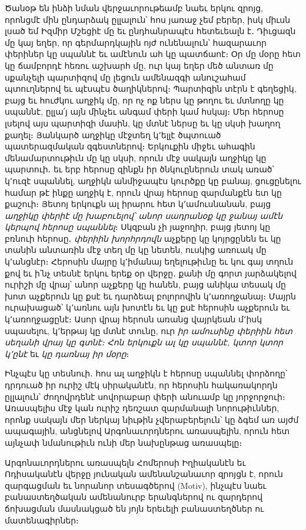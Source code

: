 \documentclass{article}
\begin{document}
{Ծանօթ են ինձի նման վերջաւորութեամբ նաեւ երկու զրոյց, որոնցմէ մին ընդարձակ ըլլալուն՝ հոս յառաջ չեմ բերեր, իսկ միւսն լսած եմ Իզմիր Մշեցիէ մը եւ ընդհանրապէս հետեւեալն է․ Դիւցազն մը կայ եղեր, որ գերմարդկային ոյժ ունենալուն՝ հազարաւոր փերիներ կը սպաննէ եւ ամէնուն ահ կը պատճաոէ։ Օր մը մօրը հետ կը ճամբորդէ հեռու աշխարհ մը, ուր կայ եղեր մեծ անտառ մը սքանչելի պարտիզով մը լեցուն ամենազգի անուշահամ պտուղներով եւ պէսպէս ծաղիկներով։ Պարտիզին տէրն է գեղեցիկ, բայց եւ հուժկու աղջիկ մը, որ ոչ ոք ներս կը թողու եւ մտնողը կը սպաննէ, ըլլա՛յ այն մինչեւ անգամ փերի կամ հսկայ։ Մեր հերոսը լսելով այս պարտիզի մասին, կը մտնէ ներսը եւ կը սկսի խաղող քաղել։ Յանկարծ աղջիկը մէջտեղ կ՚ելլէ ծպտուած պատերազմական զգեստներով։ Երկուքին միջեւ ահագին մենամարտութիւն մը կը սկսի, որուն մէջ սակայն աղջիկը կը պարտուի․ եւ երբ հերոսը զինքն իր ծնկուըներուն տակ առած՝ կ՚ուզէ սպաննել, աղջիկն անմիջապէս կուրծքը կը բանայ, ցուցընելու համար թէ ինքը աղջիկ է, որուն վրայ հերոսը զարմանքէն ետ կը քաշուի։ Յետոյ երկուքն ալ իրարու հետ կ՚ամուսնանան, բայց \emph{աղջիկը փերիէ մը խաբուելով՝ անոր սադրանօք կը ջանայ ամէն կերպով հերոսը սպաննել}։ Սկզբան չի յաջողիր, բայց յետոյ կը բռնուի հերոսը․ \emph{փերիին խորհրդովն} աչքերը կը կոյրցընեն եւ կը տանին անտառին մէջ տեղ մը կը նետեն, ուսկից առուակ մը կ՚անցնէր։ Հերոսին մայրը կ՚իմանայ եղելութիւնը եւ կու գայ տղուն քով եւ ի՛նչ տեսնէ երկու երեք օր վերջը․ քանի մը գորտ յարձակելով ուրիշի մը վրայ՝ անոր աչքերը կը հանեն, բայց անիկա տեսակ մը խոտ աչքերուն կը քսէ եւ դարձեալ բոլորովին կ՚առողջանայ։ Մայրն ուրախացած՝ կ՚առնու այն խոտէն եւ կը քսէ հերոսին աչքերուն եւ կ՚առողջացընէ։ Ասոր վրայ հերոսն առանց վայրկեան մ՚իսկ սպասելու, կ՚երթայ կը մտնէ տունը, ուր \emph{իր ամուսինը փերիին հետ սեղանի վրայ կը գտնէ։ Հոն երկուքն ալ կը սպաննէ, կտոր կտոր կ՚ընէ} եւ \emph{կը դառնայ իր մօրը}։

Ինչպէս կը տեսնուի․ հոս ալ աղջիկն է հերոսը սպաննել փորձողը՝ դրդուած իր ուրիշ մէկ սիրականէն, որ հերոսին հակառակորդն ըլլալուն՝ ժողովրդենէ սովորաբար փերի անուամբ կը յորջորջուի։ Առասպելիս մէջ կան ուրիշ դեռշատ զարմանալի նորութիւններ, որոնք սակայն մեր ներկայ նիւթին չվերաբերելուն՝ կը ձգեմ առ այժմ ապագային, անցնելով Արգոնաւորդներու առասպելին, որուն հետ այնչափ նմանութիւն ունի մեր նախընթաց առասպելը։

Արգոնաւորդներու առասպելն Հոմերոսի Իղիականէն եւ Ոդիսականէն վերջը յունական ամենանշանաւոր զրոյցն է, որուն զարգացման եւ նորանոր տեսագծերով (Motiv), ինչպէս նաեւ բանաստեղծական ամենանուրբ երանգներով ու զարդերով ճոխացման մասնակցած են յոյն երեւելի բանաստեղծներ ու մատենագիրներ։ 

}
\end{document}
